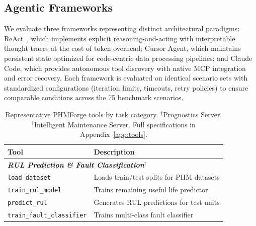 \documentclass[sigconf]{acmart}
\begin{document}
\subsection{Agentic Frameworks}
We evaluate three frameworks representing distinct architectural paradigms: ReAct~\cite{yao2023react}, which implements explicit reasoning-and-acting with interpretable thought traces at the cost of token overhead; Cursor Agent, which maintains persistent state optimized for code-centric data processing pipelines; and Claude Code, which provides autonomous tool discovery with native MCP integration and error recovery. Each framework is evaluated on identical scenario sets with standardized configurations (iteration limits, timeouts, retry policies) to ensure comparable conditions across the 75 benchmark scenarios. 
\begin{table}[t]                                                                         
  \caption{Representative PHMForge tools by task category. $^\dagger$Prognostics Server.   
  $^\ddagger$Intelligent Maintenance Server. Full specifications in                        
  Appendix~\ref{app:tools}.}                                                               
  \label{tab:tools}                                                                        
  \centering                                                                               
  \small                                                                                   
  \begin{tabular}{@{}ll@{}}                                                                
  \toprule                                                                                 
  \textbf{Tool} & \textbf{Description} \\                                                  
  \midrule                                                                                 
  \multicolumn{2}{l}{\textbf{\textit{RUL Prediction \& Fault Classification}$^\dagger$}} \\         
  \texttt{load\_dataset} & Loads train/test splits for PHM datasets \\                     
  \texttt{train\_rul\_model} & Trains remaining useful life predictor \\                   
  \texttt{predict\_rul} & Generates RUL predictions for test units \\                      
  \texttt{train\_fault\_classifier} & Trains multi-class fault classifier \\               

\end{tabular}
\end{table}
\end{document}

